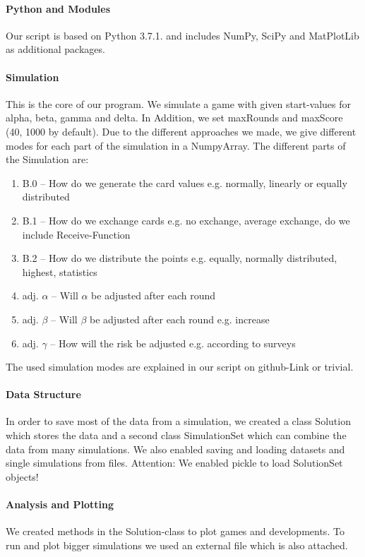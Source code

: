 \paragraph{Python and Modules}
Our script is based on Python 3.7.1. and includes NumPy, SciPy and MatPlotLib as additional packages. 

\paragraph{Simulation}
This is the core of our program. We simulate a game with given start-values for alpha, beta, gamma and delta. In Addition, we set maxRounds and maxScore (40, 1000 by default). 
Due to the different approaches we made, we give different modes for each part of the simulation in a NumpyArray. The different parts of the Simulation are:
\begin{enumerate}
\item B.0 – How do we generate the card values e.g. normally, linearly or equally distributed
\item B.1 – How do we exchange cards e.g. no exchange, average exchange, do we include Receive-Function
\item B.2 – How do we distribute the points e.g. equally, normally distributed, highest, statistics
\item adj. $\alpha$ – Will $\alpha$ be adjusted after each round
\item adj. $\beta$ – Will $\beta$ be adjusted after each round e.g. increase
\item adj. $\gamma$ – How will the risk be adjusted e.g. according to surveys
\end{enumerate}
The used simulation modes are explained in our script on github-Link or trivial. 

\paragraph{Data Structure}
In order to save most of the data from a simulation, we created a class Solution which stores the data and a second class SimulationSet which can combine the data from many simulations. We also enabled saving and loading datasets and single simulations from files. Attention: We enabled pickle to load SolutionSet objects!  

\paragraph{Analysis and Plotting}
We created methods in the Solution-class to plot games and developments. To run and plot bigger simulations we used an external file which is also attached. 

